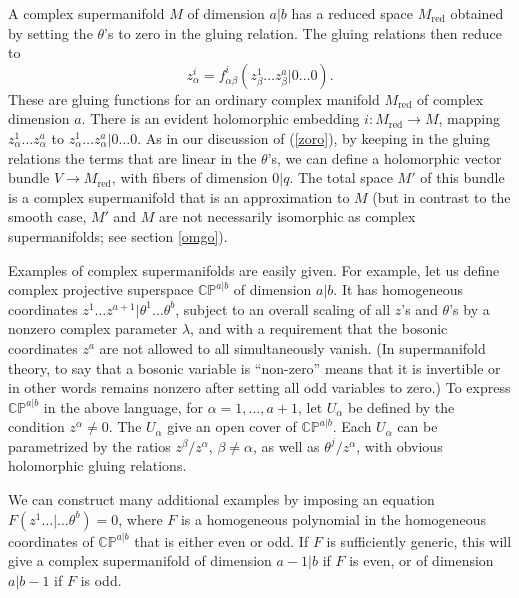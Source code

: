 \documentclass[11pt,a4paper]{article}
\def\red{{\mathrm{red}}}
\def\CP{{\mathbb{CP}}}
\begin{document}
A complex supermanifold $  M$ of dimension $a|b$ has a reduced space $M_\red$ obtained by setting the $\theta$'s to zero in the gluing relation.
The gluing relations then reduce to 
\begin{equation}\label{tono}z^i_\alpha=f^i_{\alpha\beta}(z^1_\beta\dots z^a_\beta|0\dots 0).\end{equation}
  These are gluing functions for an ordinary complex manifold
$M_\red$ of complex dimension $a$.  There is an evident holomorphic embedding $i:M_\red\to M$, mapping
$z^1_\alpha\dots z^a_\alpha$ to $z^1_\alpha\dots z^a_\alpha|0\dots 0$.
As in our discussion of (\ref{zoro}), by keeping in the gluing relations the terms that are linear in the $\theta$'s, we can define a holomorphic 
vector bundle $V\to M_\red$,
with fibers of dimension $0|q$.   The total space $M'$ of this bundle is a complex supermanifold that is an approximation to $M$ (but in contrast to the smooth case, $M'$ and $M$ are not necessarily isomorphic as complex supermanifolds; see section \ref{omgo}).

Examples of complex supermanifolds are easily given.  For example, let
us define complex projective superspace $\CP^{a|b}$ of dimension $a|b$.  It has homogeneous coordinates $z^1\dots z^{a+1}|\theta^1\dots\theta^b$,
subject to an overall scaling of all $z$'s and $\theta$'s by a nonzero complex parameter $\lambda$, and with a requirement that the bosonic coordinates
$z^a  $ are not allowed to all simultaneously vanish.  (In supermanifold theory, to say that a bosonic variable is ``non-zero'' means that it is invertible or in other
words remains nonzero after setting all odd variables to zero.)  
 To express $\CP^{a|b}$ in the above language, for $\alpha=1,\dots,a+1$, let $U_\alpha$ be defined by the condition
 $z^\alpha\not=0$. The $U_\alpha$ give an open cover of $\CP^{a|b}$.   Each $U_\alpha$ can be parametrized by the ratios $z^\beta/z^\alpha$, $\beta\not=\alpha$, as well as $\theta^j/z^\alpha$, with obvious holomorphic gluing relations.  

We can construct many additional examples  by imposing
an equation $F(z^1\dots |\dots\theta^b)=0$, where $F$ is a homogeneous polynomial in the homogeneous coordinates of $\CP^{a|b}$ that is either even or odd.  
If $F$ is sufficiently generic, this will give a complex supermanifold of dimension $a-1|b$ if $F$ is even, or of dimension $a|b-1$ if $F$ is odd.
\end{document}
